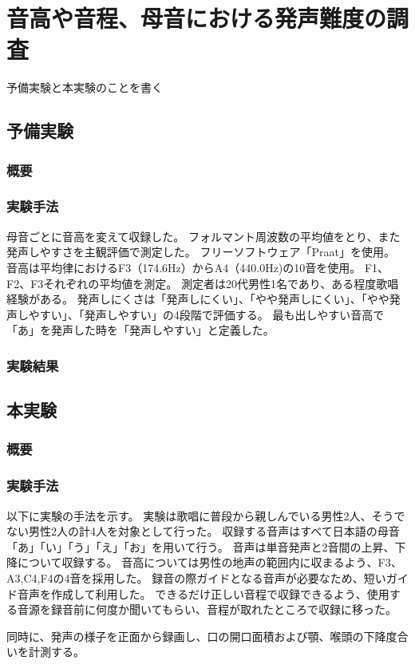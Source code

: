 \documentclass[10ptj,a4j,dvipdfmx,uplatex]{jsbook}
\begin{document}
\chapter{音高や音程、母音における発声難度の調査}
予備実験と本実験のことを書く

\section{予備実験}
\subsection{概要}
\subsection{実験手法}
母音ごとに音高を変えて収録した。
フォルマント周波数の平均値をとり、また発声しやすさを主観評価で測定した。
フリーソフトウェア「Praat」を使用。
音高は平均律におけるF3（174.6Hz）からA4（440.0Hz)の10音を使用。
F1、F2、F3それぞれの平均値を測定。
測定者は20代男性1名であり、ある程度歌唱経験がある。
発声しにくさは「発声しにくい」、「やや発声しにくい」、「やや発声しやすい」、「発声しやすい」の4段階で評価する。
最も出しやすい音高で「あ」を発声した時を「発声しやすい」と定義した。
\subsection{実験結果}

\section{本実験}
\subsection{概要}
\subsection{実験手法}
以下に実験の手法を示す。
実験は歌唱に普段から親しんでいる男性2人、そうでない男性2人の計4人を対象として行った。
収録する音声はすべて日本語の母音「あ」「い」「う」「え」「お」を用いて行う。
音声は単音発声と2音間の上昇、下降について収録する。
音高については男性の地声の範囲内に収まるよう、F3、A3,C4,F4の4音を採用した。
録音の際ガイドとなる音声が必要なため、短いガイド音声を作成して利用した。
できるだけ正しい音程で収録できるよう、使用する音源を録音前に何度か聞いてもらい、音程が取れたところで収録に移った。

同時に、発声の様子を正面から録画し、口の開口面積および顎、喉頭の下降度合いを計測する。
\end{document}
